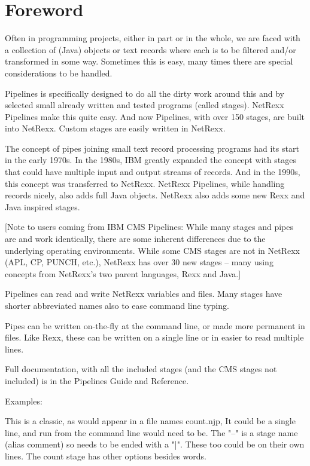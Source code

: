 \chapter*{Foreword}
Often in programming projects, either in part or in the whole, we are faced with a collection of (Java) objects or text records where each is to be filtered and/or transformed in some way.  Sometimes this is easy, many times there are special considerations to be handled.

Pipelines is specifically designed to do all the dirty work around this and by selected small already written and tested programs (called stages).  NetRexx Pipelines make this quite easy.  And now Pipelines, with over 150 stages, are built into NetRexx.  Custom stages are easily written in NetRexx.

The concept of pipes joining small text record processing programs had its start in the early 1970s.  In the 1980s, IBM greatly expanded the concept with stages that could have multiple input and output streams of records.  And in the 1990s, this concept was transferred to NetRexx.  NetRexx Pipelines, while handling records nicely, also adds full Java objects.  NetRexx also adds some new Rexx and Java inspired stages.

[Note to users coming from IBM CMS Pipelines:  While many stages and pipes are and work identically, there are some inherent differences due to the underlying operating environments. While some CMS stages are not in NetRexx (APL, CP, PUNCH, etc.), NetRexx has over 30 new stages -- many using concepts from NetRexx's two parent languages, Rexx and Java.]

Pipelines can read and write NetRexx variables and files.   Many stages have shorter abbreviated names also to ease command line typing.

Pipes can be written on-the-fly at the command line, or made more permanent in files.  Like Rexx, these can be written on a single line or in easier to read multiple lines.

Full documentation, with all the included stages (and the CMS stages not included) is in the Pipelines Guide and Reference.

Examples:

This is a classic, as would appear in a file names count.njp,  It could be a single line, and run from the command line would need to be.  The "--" is a stage name (alias comment) so needs to be ended with a "|".  These too could be on their own lines.  The count stage has other options besides words.

